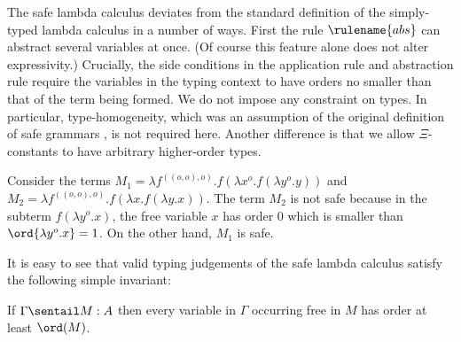 The safe lambda calculus deviates from the standard definition of
the simply-typed lambda calculus in a number of ways. %
First the rule $\rulename{abs}$ can abstract several variables at once. (Of course this feature alone does not alter expressivity.) Crucially,
the side conditions in the application rule and abstraction rule
require the variables in the typing context to have orders no
smaller than that of the term being formed.  We do not impose any
constraint on types. In particular, type-homogeneity, which was an
assumption of the original definition of safe grammars \cite{KNU02},
is not required here. Another difference is that we allow
$\Xi$-constants to have
arbitrary higher-order types.
\bigskip


\begin{example}
\label{ex:kierstead}
Consider the terms $M_1 = \lambda f^{((o,o),o)} . f (\lambda x^o . f (\lambda y^o . y
))$ and $M_2 = \lambda f^{((o,o),o)} . f (\lambda x . f (\lambda y .x ))$. The term $M_2$ is not safe because in the subterm $f (\lambda y^o . x)$, the free variable $x$ has order $0$ which
is smaller than $\ord{\lambda y^o . x} = 1$.  On the other hand, $M_1$
is safe.
\end{example}

It is easy to see that valid typing judgements of the safe lambda
calculus satisfy the following simple invariant:
\begin{lemma}
\label{lem:ordfreevar}
If $\Gamma \sentail M : A$ then every variable in $\Gamma$ occurring
free in $M$ has order at least $\ord(M)$.
\end{lemma}

